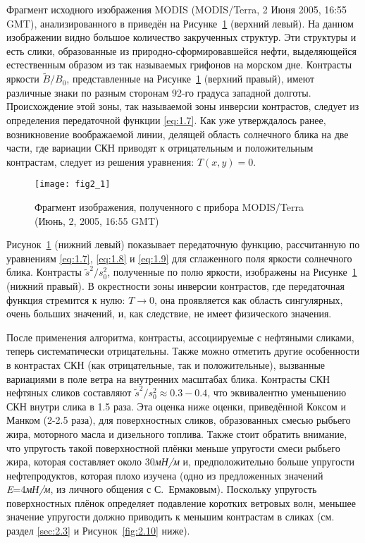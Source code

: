 Фрагмент исходного изображения MODIS (MODIS/Terra, 2 Июня 2005, 16:55 GMT), анализированного в \citep{Hu2009} приведён на Рисунке~\ref{fig:2.1} (верхний левый). На данном изображении видно большое количество закрученных структур. Эти структуры и есть слики, образованные из природно-сформировавшейся нефти, выделяющейся естественным образом из так называемых грифонов на морском дне. Контрасты яркости $\tilde{B}/B_{0} $, представленные на Рисунке~\ref{fig:2.1} (верхний правый), имеют различные знаки по разным сторонам 92-го градуса западной долготы. Происхождение этой зоны, так называемой зоны инверсии контрастов, следует из определения передаточной функции \eqref{eq:1.7}. Как уже утверждалось ранее, возникновение воображаемой линии, делящей область солнечного блика на две части, где вариации СКН приводят к отрицательным и положительным контрастам, следует из решения уравнения: $T(x,y)=0$.



\begin{figure}[!thb]
 \texttt{[image: fig2\_1]}
 \caption{Фрагмент изображения, полученного с прибора MODIS/Terra (Июнь, 2, 2005, 16:55 GMT)}
 \label{fig:2.1}
\end{figure}


Рисунок~\ref{fig:2.1} (нижний левый) показывает передаточную функцию, рассчитанную по уравнениям \eqref{eq:1.7}, \eqref{eq:1.8} и \eqref{eq:1.9} для сглаженного поля яркости солнечного блика. Контрасты $\tilde{s}^{2} /s_{0}^{2} $, полученные по полю яркости, изображены на Рисунке~\ref{fig:2.1} (нижний правый). В окрестности зоны инверсии контрастов, где передаточная функция стремится к нулю: $T\to 0$, она проявляется как область сингулярных, очень больших значений, и, как следствие, не имеет физического значения.

После применения алгоритма, контрасты, ассоциируемые с нефтяными сликами, теперь систематически отрицательны. Также можно отметить другие особенности в контрастах СКН (как отрицательные, так и положительные), вызванные вариациями в поле ветра на внутренних масштабах блика. Контрасты СКН нефтяных сликов составляют $\tilde{s}^{2} /s_{0}^{2} \approx 0.3-0.4$, что эквивалентно уменьшению СКН внутри слика в 1.5 раза. Эта оценка ниже оценки, приведённой Коксом и Манком \citep{Cox1954a} (2-2.5 раза), для поверхностных сликов, образованных смесью рыбьего жира, моторного масла и дизельного топлива. Также стоит обратить внимание, что упругость такой поверхностной плёнки меньше упругости смеси рыбьего жира, которая составляет около 30\textit{мН/м} и, предположительно больше упругости нефтепродуктов, которая плохо изучена (одно из предложенных значений \textit{E}=4\textit{мН/м}, из личного общения с С.~Ермаковым). Поскольку упругость поверхностных плёнок определяет подавление коротких ветровых волн, меньшее значение упругости должно приводить к меньшим контрастам в сликах (см. раздел \ref{sec:2.3} и Рисунок~\ref{fig:2.10} ниже).

